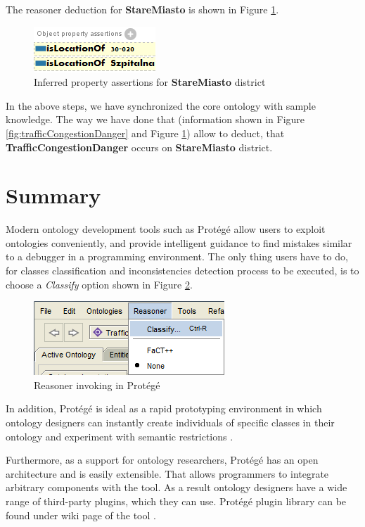 \noindent The reasoner deduction for \textbf{StareMiasto} is shown in Figure \ref{fig:stareMiasto}.

\medskip

\begin{figure}[htp]
\centering
\includegraphics[scale=0.7]{images/chapter3/StareMiasto}
\caption{Inferred property assertions for \textbf{StareMiasto} district}
\label{fig:stareMiasto}
\end{figure}

\noindent In the above steps, we have synchronized the core ontology with sample knowledge. The way we have done that (information shown in Figure \ref{fig:trafficCongestionDanger} and Figure \ref{fig:stareMiasto}) allow to deduct, that \textbf{TrafficCongestionDanger} occurs on \textbf{StareMiasto} district.

\section{Summary}
\label{sub:ontologyDevelopementSummary}

Modern ontology development tools such as Protégé allow users to exploit ontologies conveniently, and provide intelligent guidance to find mistakes similar to a debugger in a programming environment. The only thing users have to do, for classes classification and inconsistencies detection process to be executed, is to choose a \textit{Classify} option shown in Figure \ref{fig:classify}.

\newpage

\begin{figure}[htp]
\centering
\includegraphics[scale=0.7]{images/chapter3/Classify}
\caption{Reasoner invoking in Protégé}
\label{fig:classify}
\end{figure}

\noindent In addition, Protégé is ideal as a rapid prototyping environment in which ontology designers can instantly create individuals of specific classes in their ontology and experiment with semantic restrictions \cite{OntDrivDev}.

Furthermore, as a support for ontology researchers, Protégé has an open architecture and is easily extensible. That allows programmers to integrate arbitrary components with the tool. As a result ontology designers have a wide range of third-party plugins, which they can use. Protégé plugin library can be found under wiki page of the tool \cite{ProtegeWiki}. 
